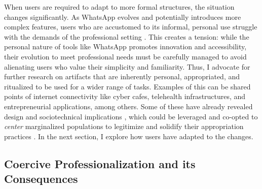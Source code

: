 

When users are required to adapt to more formal structures, the situation changes significantly. As WhatsApp evolves and potentially introduces more complex features, users who are accustomed to its informal, personal use struggle with the demands of the professional setting \cite{10.1145/3613905.3651034}. This creates a tension: while the personal nature of tools like WhatsApp promotes innovation and accessibility, their evolution to meet professional needs must be carefully managed to avoid alienating users who value their simplicity and familiarity. Thus, I advocate for further research on artifacts that are inherently personal, appropriated, and ritualized to be used for a wider range of tasks. Examples of this can be shared points of internet connectivity like cyber cafes, telehealth infrastructures, and entrepreneurial applications, among others. Some of these have already revealed design \cite{furuholt2018role} and sociotechnical implications \cite{Rangaswamy2011CuttingChai}, which could be leveraged and co-opted to \textit{center} marginalized populations to legitimize and solidify their appropriation practices \cite{berger2020doing}. In the next section, I explore how users have adapted to the changes.





\subsection{Coercive Professionalization and its Consequences}


